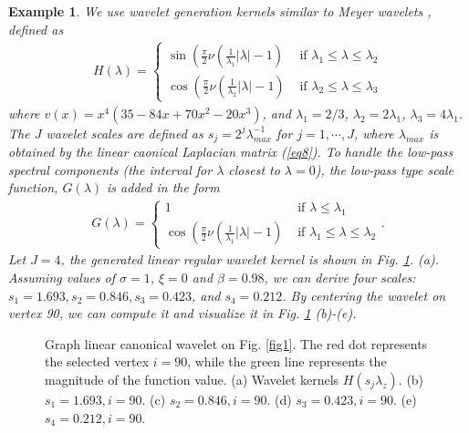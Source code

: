 \documentclass[lettersize,journal]{IEEEtran}
\newtheorem{example}{Example}
\begin{document}
\begin{example} \label{exam2}
	We use wavelet generation kernels similar to Meyer wavelets \cite{leonardi2011wavelet}, defined as
	\begin{align}
			H(\lambda)= \begin{cases}\sin \left(\frac{\pi}{2} \nu\left(\frac{1}{\lambda_1}|\lambda|-1\right)\right. & \text { if } \lambda_1 \leq \lambda \leq \lambda_2 \\ \cos \left(\frac{\pi}{2} \nu\left(\frac{1}{\lambda_2}|\lambda|-1\right)\right. & \text { if } \lambda_2 \leq \lambda \leq \lambda_3\end{cases}
	\end{align}
	where $v(x)=x^4(35-84x+70x^2-20x^3)$, and $\lambda_1=2/3$, $\lambda_2=2\lambda_1$, $\lambda_3=4\lambda_1$.  The $J$ wavelet scales are defined as $s_j=2^j\lambda_{max}^{-1}$ for $j=1,\cdots,J$, where $\lambda_{max}$ is obtained by the linear caonical Laplacian matrix (\ref{eq8}).
	To handle the low-pass spectral components (the interval for $\lambda$ closest to $ \lambda= 0$), the low-pass type scale function, $G(\lambda)$ is added in the form
	\begin{align}
		G(\lambda)= \begin{cases}1 & \text { if } \lambda \leq \lambda_1 \\ \cos \left(\frac{\pi}{2} \nu\left(\frac{1}{\lambda_1}|\lambda|-1\right)\right. & \text { if } \lambda_1 \leq \lambda \leq \lambda_2\end{cases}.
	\end{align}
	Let $J=4$, the generated linear regular wavelet kernel is shown in Fig. \ref{fig4}. (a). Assuming values of $\sigma=1$, $\xi=0$ and $\beta=0.98$, we can derive four scales: $s_1=1.693, s_2=0.846, s_3=0.423$, and $s_4=0.212$. By centering the wavelet on vertex 90, we can compute it and visualize it in Fig. \ref{fig4} (b)-(e).
\end{example}


\begin{figure}
	\centering
	\quad
	\quad
	\caption{Graph linear canonical wavelet on Fig. \ref{fig1}. The red dot represents the selected vertex $i=90$, while the green line represents the magnitude of the function value. (a) Wavelet kernels $H(s_j \lambda_z)$. (b) $s_1=1.693, i=90$. (c) $s_2=0.846, i=90$. (d)  $s_3=0.423, i=90$. (e)  $s_4=0.212, i=90$. }\label{fig4}
\end{figure}
\end{document}
